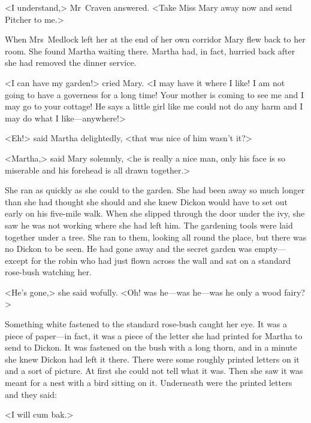 <I understand,> Mr~Craven answered. <Take Miss Mary away now and send Pitcher to me.>

When Mrs~Medlock left her at the end of her own corridor Mary flew back to her room. She found Martha waiting there. Martha had, in fact, hurried back after she had removed the dinner service.

<I can have my garden!> cried Mary. <I may have it where I like! I am not going to have a governess for a long time! Your mother is coming to see me and I may go to your cottage! He says a little girl like me could not do any harm and I may do what I like—anywhere!>

<Eh!> said Martha delightedly, <that was nice of him wasn't it?>

<Martha,> said Mary solemnly, <he is really a nice man, only his face is so miserable and his forehead is all drawn together.>

She ran as quickly as she could to the garden. She had been away so much longer than she had thought she should and she knew Dickon would have to set out early on his five-mile walk. When she slipped through the door under the ivy, she saw he was not working where she had left him. The gardening tools were laid together under a tree. She ran to them, looking all round the place, but there was no Dickon to be seen. He had gone away and the secret garden was empty—except for the robin who had just flown across the wall and sat on a standard rose-bush watching her.

<He's gone,> she said wofully. <Oh! was he—was he—was he only a wood fairy?>

Something white fastened to the standard rose-bush caught her eye. It was a piece of paper—in fact, it was a piece of the letter she had printed for Martha to send to Dickon. It was fastened on the bush with a long thorn, and in a minute she knew Dickon had left it there. There were some roughly printed letters on it and a sort of picture. At first she could not tell what it was. Then she saw it was meant for a nest with a bird sitting on it. Underneath were the printed letters and they said:

<I will cum bak.>